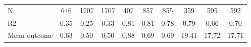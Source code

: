 \begin{tabular}{lccc|ccc|ccc}
N           &         646         &        1707         &        1707         &         407         &         857         &         855         &         359         &         595         &         592         \\
R2          &        0.35         &        0.25         &        0.33         &        0.81         &        0.81         &        0.78         &        0.79         &        0.66         &        0.70         \\
Mean outcome&        0.63         &        0.50         &        0.50         &        0.88         &        0.69         &        0.69         &       19.41         &       17.72         &       17.71         \\
\bottomrule \end{tabular}
